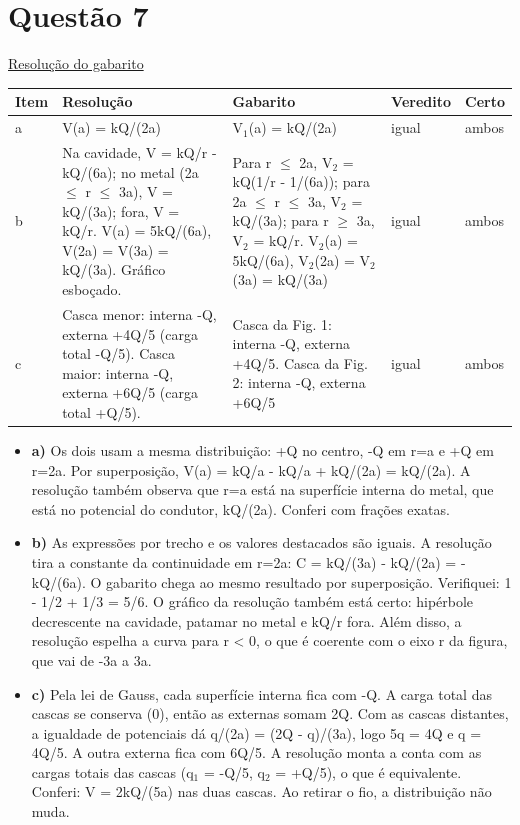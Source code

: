 \documentclass{article}%
\begin{document}
\section*{Questão 7}%
\href{https://poliedroresolve.sistemapoliedro.com.br/vestibulares/ime/2026/ime-2-fase-dia-2-24-10-2025-2-fase-dia-2/dissertativa-7-fisica-2-fase-dia-2-ime-2026}{Resolução do gabarito}\par\smallskip%
\begin{longtable}{@{}p{} p{} p{} p{} p{}@{}}\toprule Item & Resolução & Gabarito & Veredito & Certo \\ \midrule
a & V(a) = kQ/(2a) & V$_{1}$(a) = kQ/(2a) & igual & ambos \\
b & Na cavidade, V = kQ/r - kQ/(6a); no metal (2a $\leq$ r $\leq$ 3a), V = kQ/(3a); fora, V = kQ/r. V(a) = 5kQ/(6a), V(2a) = V(3a) = kQ/(3a). Gráfico esboçado. & Para r $\leq$ 2a, V$_{2}$ = kQ(1/r - 1/(6a)); para 2a $\leq$ r $\leq$ 3a, V$_{2}$ = kQ/(3a); para r $\geq$ 3a, V$_{2}$ = kQ/r. V$_{2}$(a) = 5kQ/(6a), V$_{2}$(2a) = V$_{2}$(3a) = kQ/(3a) & igual & ambos \\
c & Casca menor: interna -Q, externa +4Q/5 (carga total -Q/5). Casca maior: interna -Q, externa +6Q/5 (carga total +Q/5). & Casca da Fig. 1: interna -Q, externa +4Q/5. Casca da Fig. 2: interna -Q, externa +6Q/5 & igual & ambos \\
\bottomrule\end{longtable}%
\begin{itemize}%
\item%
\textbf{a)} Os dois usam a mesma distribuição: +Q no centro, -Q em r=a e +Q em r=2a. Por superposição, V(a) = kQ/a - kQ/a + kQ/(2a) = kQ/(2a). A resolução também observa que r=a está na superfície interna do metal, que está no potencial do condutor, kQ/(2a). Conferi com frações exatas.%
\item%
\textbf{b)} As expressões por trecho e os valores destacados são iguais. A resolução tira a constante da continuidade em r=2a: C = kQ/(3a) - kQ/(2a) = -kQ/(6a). O gabarito chega ao mesmo resultado por superposição. Verifiquei: 1 - 1/2 + 1/3 = 5/6. O gráfico da resolução também está certo: hipérbole decrescente na cavidade, patamar no metal e kQ/r fora. Além disso, a resolução espelha a curva para r < 0, o que é coerente com o eixo r da figura, que vai de -3a a 3a.%
\item%
\textbf{c)} Pela lei de Gauss, cada superfície interna fica com -Q. A carga total das cascas se conserva (0), então as externas somam 2Q. Com as cascas distantes, a igualdade de potenciais dá q/(2a) = (2Q - q)/(3a), logo 5q = 4Q e q = 4Q/5. A outra externa fica com 6Q/5. A resolução monta a conta com as cargas totais das cascas (q$_{1}$ = -Q/5, q$_{2}$ = +Q/5), o que é equivalente. Conferi: V = 2kQ/(5a) nas duas cascas. Ao retirar o fio, a distribuição não muda.%
\end{itemize}%
\end{document}
